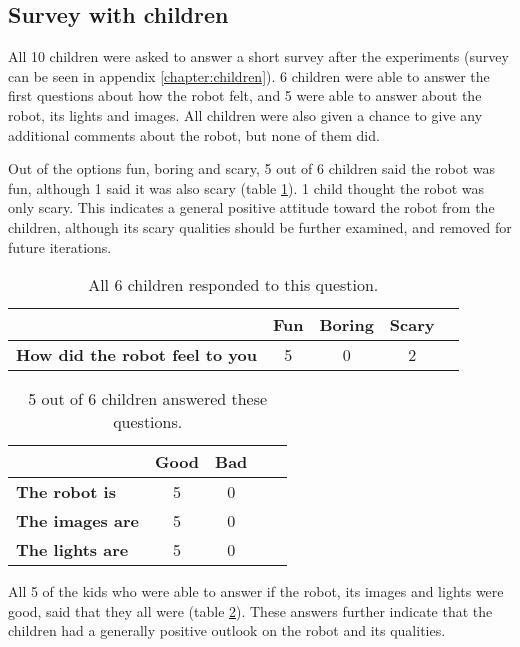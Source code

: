 \subsection{Survey with children}

All 10 children were asked to answer a short survey after the experiments (survey can be seen in appendix \ref{chapter:children}). 6 children were able to answer the first questions about how the robot felt, and 5 were able to answer about the robot, its lights and images. All children were also given a chance to give any additional comments about the robot, but none of them did.

Out of the options fun, boring and scary, 5 out of 6 children said the robot was fun, although 1 said it was also scary (table \ref{table:kidsFeeling}). 1 child thought the robot was only scary. This indicates a general positive attitude toward the robot from the children, although its scary qualities should be further examined, and removed for future iterations.

\begin{table}
  \centering
  \renewcommand{\arraystretch}{1.2}
  \begin{tabular}{|p{4cm}|c|c|c|c|}
    \hline
     & 
    \textbf{Fun} &
    \textbf{Boring} &
    \textbf{Scary} \\\hline
    \textbf{How did the robot feel to you} & 5 & 0 & 2 \\ \hline
  \end{tabular}
  \caption{All 6 children responded to this question.}
  \label{table:kidsFeeling}
\end{table}

\begin{table}
  \centering
  \renewcommand{\arraystretch}{1.2}
  \begin{tabular}{|p{4cm}|c|c|c|c|}
    \hline
     & 
    \textbf{Good} &
    \textbf{Bad} \\\hline
    \textbf{The robot is} & 5 & 0\\ \hline
    \textbf{The images are} & 5 & 0\\ \hline
    \textbf{The lights are} & 5 & 0\\ \hline
  \end{tabular}
  \caption{5 out of 6 children answered these questions.}
  \label{table:kidsDesign}
\end{table}


All 5 of the kids who were able to answer if the robot, its images and lights were good, said that they all were (table \ref{table:kidsDesign}). These answers further indicate that the children had a generally positive outlook on the robot and its qualities. 


